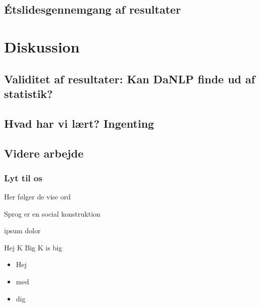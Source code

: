 \documentclass{beamer}
\begin{document}
\subsection{Étslidesgennemgang af resultater}

\section{Diskussion}
\subsection{Validitet af resultater: Kan DaNLP finde ud af statistik?}
\subsection{Hvad har vi lært? Ingenting}
\subsection{Videre arbejde}

\begin{frame}
    \frametitle{Lyt til os}
    Her følger de vise ord
    \begin{definition}
        Sprog er en social konstruktion
    \end{definition}
    \begin{example}
        ipsum dolor
    \end{example}
    \begin{block}{Hej K}
        Big K is big
    \end{block}
    \begin{itemize}
        \pause
        \item Hej
        \pause
        \item med
        \pause
        \item dig
    \end{itemize}
\end{frame}
\end{document}
